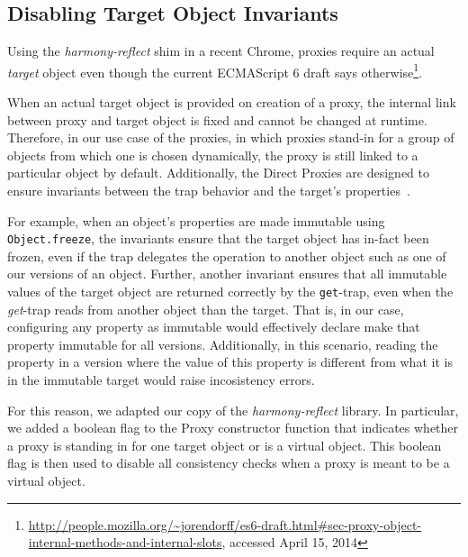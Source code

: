 \subsection{Disabling Target Object Invariants}



Using the \emph{harmony-reflect} shim in a recent Chrome, proxies require an actual \emph{target} object even though the current ECMAScript 6 draft says otherwise\footnote{\url{http://people.mozilla.org/~jorendorff/es6-draft.html\#sec-proxy-object-internal-methods-and-internal-slots}, accessed April 15, 2014}.

When an actual target object is provided on creation of a proxy, the internal link between proxy and target object is fixed and cannot be changed at runtime.
Therefore, in our use case of the proxies, in which proxies stand-in for a group of objects from which one is chosen dynamically, the proxy is still linked to a particular object by default.
Additionally, the Direct Proxies are designed to ensure invariants between the trap behavior and the target's properties~\cite{Cutsem2013TRP}.

For example, when an object's properties are made immutable using \lstinline{Object.freeze}, the invariants ensure that the target object has in-fact been frozen, even if the trap delegates the operation to another object such as one of our versions of an object.
Further, another invariant ensures that all immutable values of the target object are returned correctly by the \lstinline{get}-trap, even when the \emph{get}-trap reads from another object than the target. 
That is, in our case, configuring any property as immutable would effectively declare make that property immutable for all versions.
Additionally, in this scenario, reading the property in a version where the value of this property is different from what it is in the immutable target would raise incosistency errors.

For this reason, we adapted our copy of the \emph{harmony-reflect} library.
In particular, we added a boolean flag to the Proxy constructor function that indicates whether a proxy is standing in for one target object or is a virtual object.
This boolean flag is then used to disable all consistency checks when a proxy is meant to be a virtual object.

